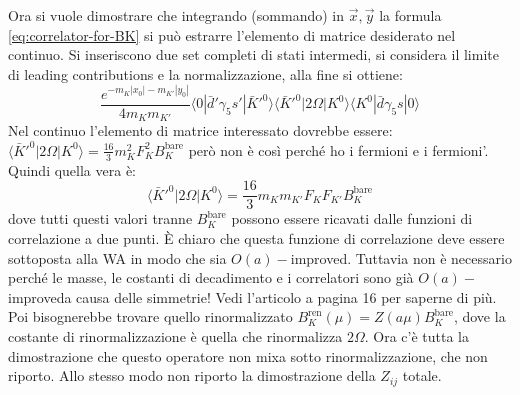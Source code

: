 \documentclass[12pt,a4paper,openright]{article}
\newcommand{\la}{\langle}
\newcommand{\ra}{\rangle}
\newcommand{\colg}{\textcolor{PineGreen}}
\newcommand{\bare}{^{\text{bare}}}
\newcommand{\ren}{{\text{ren}}}
\newcommand{\oai}{$O(a)-$improved}
\begin{document}
Ora si vuole dimostrare che integrando (sommando) in $\vec x,\vec y$ la formula \ref{eq:correlator-for-BK} si può estrarre l'elemento di matrice desiderato nel continuo.
Si inseriscono due set completi di stati intermedi, si considera il limite di leading contributions e la normalizzazione, alla fine si ottiene:
\begin{equation*}
  \frac{e^{-m_K |x_0|-m_{K'}|y_0|}}{4 m_K m_{K'}} \la 0 | \bar d'  \gamma_5 s'  | \bar K'^0 \ra \la \bar K'^0 | 2\Omega | K^0 \ra\la K^0 | \bar d \gamma_5 s | 0 \ra 
\end{equation*}
Nel continuo l'elemento di matrice interessato dovrebbe essere: $\la \bar K'^0 | 2\Omega | K^0 \ra = \frac{16}{3} m_K^2 F_K^2 B_K\bare$
però non è così perché ho i fermioni e i fermioni'. Quindi quella vera è:
\begin{equation*}
  \la \bar K'^0 | 2\Omega | K^0 \ra = \frac{16}{3} m_K m_{K'} F_K F_{K'} B_K\bare
\end{equation*}
dove tutti questi valori tranne $B_K\bare$ possono essere ricavati dalle funzioni di correlazione a due punti.
È chiaro che questa funzione di correlazione deve essere sottoposta alla WA in modo che sia \oai.
\colg{Tuttavia non è necessario perché le masse, le costanti di decadimento e i correlatori sono già \oai\space a causa delle simmetrie! Vedi l'articolo a pagina 16 per saperne di più.}
\newline
Poi bisognerebbe trovare quello rinormalizzato $B_K^\ren (\mu) = Z (a\mu) B_K\bare$, dove la costante di rinormalizzazione è quella che rinormalizza $2\Omega$.
Ora c'è tutta la dimostrazione che questo operatore non mixa sotto rinormalizzazione, che non riporto.
Allo stesso modo non riporto la dimostrazione della $Z_{ij}$ totale.

\newpage
\end{document}
